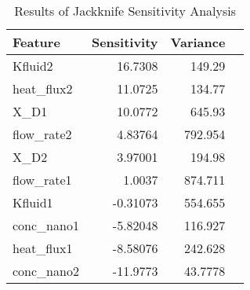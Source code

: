 
    \begin{table*}
        \centering
        \begin{tabular}{p{12cm}rrr}
\hline
\hline
 Feature     &   Sensitivity &   Variance \\
\hline
 Kfluid2     &      16.7308  &   149.29   \\
 heat\_flux2 &      11.0725  &   134.77   \\
 X\_D1       &      10.0772  &   645.93   \\
 flow\_rate2 &       4.83764 &   792.954  \\
 X\_D2       &       3.97001 &   194.98   \\
 flow\_rate1 &       1.0037  &   874.711  \\
 Kfluid1     &      -0.31073 &   554.655  \\
 conc\_nano1 &      -5.82048 &   116.927  \\
 heat\_flux1 &      -8.58076 &   242.628  \\
 conc\_nano2 &     -11.9773  &    43.7778 \\
\hline
\end{tabular}

        \caption{Results of Jackknife Sensitivity Analysis}
        \label{jackknife}
    \end{table*}
    
